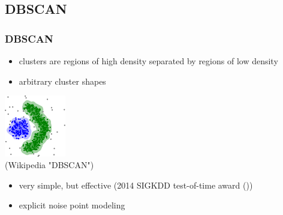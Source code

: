 \documentclass[Nike]{tuberlinbeamer}
\begin{document}
\subsection{DBSCAN}
\begin{frame}
  \frametitle{DBSCAN}
  \begin{itemize}
    \item clusters are regions of high density separated by regions of low density
    \item arbitrary cluster shapes
  \end{itemize}
  \begin{centering}
  \includegraphics[width=0.2\textwidth]{DBSCAN_data.png}\\
  \tiny (Wikipedia "DBSCAN")
  \end{centering}
  \pause
  \normalsize
  \begin{itemize}
    \item very simple, but effective (2014 SIGKDD test-of-time award (\cite{schubert2017dbscan}))\\
    \item explicit noise point modeling
  \end{itemize}
\end{frame}
\end{document}
